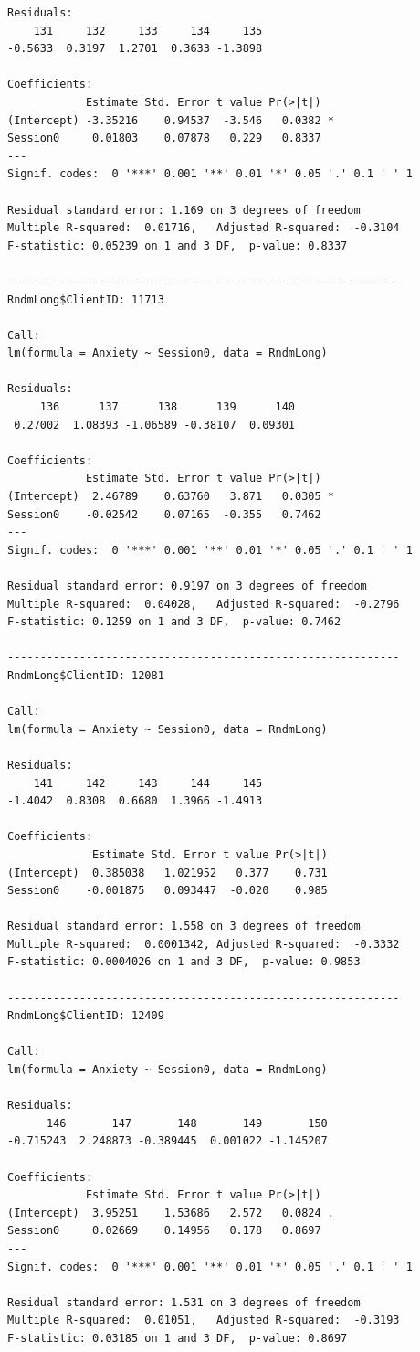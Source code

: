 \documentclass[
  english,
]{book}
\begin{document}
\begin{verbatim}
Residuals:
    131     132     133     134     135 
-0.5633  0.3197  1.2701  0.3633 -1.3898 

Coefficients:
            Estimate Std. Error t value Pr(>|t|)  
(Intercept) -3.35216    0.94537  -3.546   0.0382 *
Session0     0.01803    0.07878   0.229   0.8337  
---
Signif. codes:  0 '***' 0.001 '**' 0.01 '*' 0.05 '.' 0.1 ' ' 1

Residual standard error: 1.169 on 3 degrees of freedom
Multiple R-squared:  0.01716,   Adjusted R-squared:  -0.3104 
F-statistic: 0.05239 on 1 and 3 DF,  p-value: 0.8337

------------------------------------------------------------ 
RndmLong$ClientID: 11713

Call:
lm(formula = Anxiety ~ Session0, data = RndmLong)

Residuals:
     136      137      138      139      140 
 0.27002  1.08393 -1.06589 -0.38107  0.09301 

Coefficients:
            Estimate Std. Error t value Pr(>|t|)  
(Intercept)  2.46789    0.63760   3.871   0.0305 *
Session0    -0.02542    0.07165  -0.355   0.7462  
---
Signif. codes:  0 '***' 0.001 '**' 0.01 '*' 0.05 '.' 0.1 ' ' 1

Residual standard error: 0.9197 on 3 degrees of freedom
Multiple R-squared:  0.04028,   Adjusted R-squared:  -0.2796 
F-statistic: 0.1259 on 1 and 3 DF,  p-value: 0.7462

------------------------------------------------------------ 
RndmLong$ClientID: 12081

Call:
lm(formula = Anxiety ~ Session0, data = RndmLong)

Residuals:
    141     142     143     144     145 
-1.4042  0.8308  0.6680  1.3966 -1.4913 

Coefficients:
             Estimate Std. Error t value Pr(>|t|)
(Intercept)  0.385038   1.021952   0.377    0.731
Session0    -0.001875   0.093447  -0.020    0.985

Residual standard error: 1.558 on 3 degrees of freedom
Multiple R-squared:  0.0001342, Adjusted R-squared:  -0.3332 
F-statistic: 0.0004026 on 1 and 3 DF,  p-value: 0.9853

------------------------------------------------------------ 
RndmLong$ClientID: 12409

Call:
lm(formula = Anxiety ~ Session0, data = RndmLong)

Residuals:
      146       147       148       149       150 
-0.715243  2.248873 -0.389445  0.001022 -1.145207 

Coefficients:
            Estimate Std. Error t value Pr(>|t|)  
(Intercept)  3.95251    1.53686   2.572   0.0824 .
Session0     0.02669    0.14956   0.178   0.8697  
---
Signif. codes:  0 '***' 0.001 '**' 0.01 '*' 0.05 '.' 0.1 ' ' 1

Residual standard error: 1.531 on 3 degrees of freedom
Multiple R-squared:  0.01051,   Adjusted R-squared:  -0.3193 
F-statistic: 0.03185 on 1 and 3 DF,  p-value: 0.8697
\end{verbatim}
\end{document}
